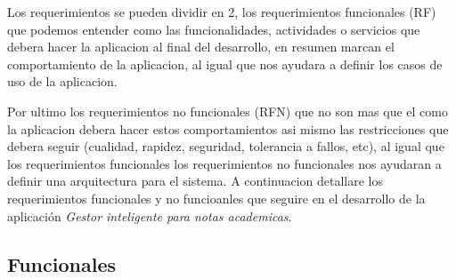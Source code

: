 \vspace{.5cm}

\noindent Los requerimientos se pueden dividir en 2, los requerimientos funcionales (RF) que podemos entender como las funcionalidades, actividades o servicios que debera hacer la aplicacion al final del desarrollo, en resumen marcan el comportamiento de la aplicacion, al igual que nos ayudara a definir los casos de uso de la aplicacion.

\vspace{.5cm}

Por ultimo los requerimientos no funcionales (RFN) que no son mas que el como la aplicacion debera hacer estos comportamientos asi mismo las restricciones que debera seguir (cualidad, rapidez, seguridad, tolerancia a fallos, etc), al igual que los requerimientos funcionales los requerimientos no funcionales nos ayudaran a definir una arquitectura para el sistema. A continuacion detallare los requerimientos funcionales y no funcioanles que seguire en el desarrollo de la aplicación \emph{Gestor inteligente para notas academicas}.  




\subsection{Funcionales}

